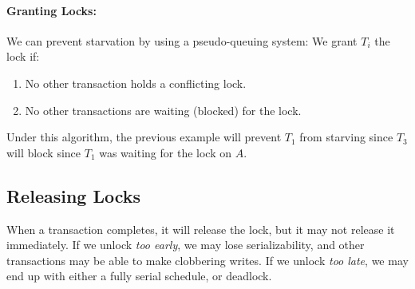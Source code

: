 \documentclass{report}
\renewcommand{\it}[1]{\textit{{#1}}}
\begin{document}
\paragraph{Granting Locks:} We can prevent starvation by using a pseudo-queuing
system: We grant $T_i$ the lock if:
\begin{enumerate}[label=(\arabic*)]
    \item No other transaction holds a conflicting lock.
    \item No other transactions are waiting (blocked) for the lock.
\end{enumerate}

Under this algorithm, the previous example will prevent $T_1$ from starving
since $T_3$ will block since $T_1$ was waiting for the lock on $A$.

\subsection{Releasing Locks}
When a transaction completes, it will release the lock, but it may not release
it immediately. If we unlock \it{too early}, we may lose serializability, and other
transactions may be able to make clobbering writes. If we unlock \it{too late},
we may end up with either a fully serial schedule, or deadlock.
\end{document}
